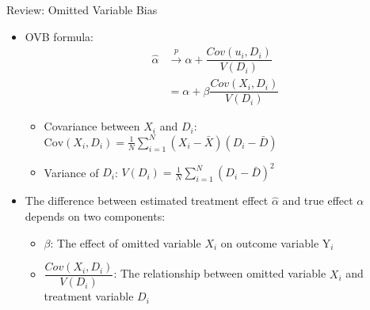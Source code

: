 \documentclass[dvipsnames,hyperref={pdfpagelabels=false}]{beamer}
\begin{document}
\begin{frame}{Review: Omitted Variable Bias}

\begin{itemize}


\item OVB formula: 
\begin{equation*}
	\begin{aligned}
   \hat{\alpha} &\overset{p}{\rightarrow} \alpha + \dfrac{Cov(u_{i},D_{i})}{V(D_{i})}  \\	
       &= \alpha + \beta \dfrac{Cov(X_{i},D_{i})}{V(D_{i})}
   	\end{aligned}	
	\end{equation*}


\begin{itemize}
\item Covariance between $X_{i}$ and $D_{i}$: $\text{Cov}(X_i, D_i) = \frac{1}{N} \sum^N_{i=1} (X_i - \bar{X})(D_i - \bar{D})$
\vspace{0.3cm}

\item Variance of $D_{i}$: $V(D_i) = \frac{1}{N} \sum^N_{i=1} (D_i - \bar{D})^2$

\vspace{0.3cm}
\end{itemize}

\item The difference between estimated treatment effect $\hat{\alpha}$ and true effect $\alpha$ depends on two components:
\vspace{0.3cm}
\begin{itemize}
\item[1] $\beta$: The effect of omitted variable $X_{i}$ on outcome variable $\mathrm{Y}_{i}$ 
\vspace{0.3cm}
\item[2] $\dfrac{Cov(X_{i},D_{i})}{V(D_{i})}$: The relationship between omitted variable $X_{i}$ and treatment variable $D_{i}$ 


\end{itemize}
	
\end{itemize}

\end{frame}
\end{document}
